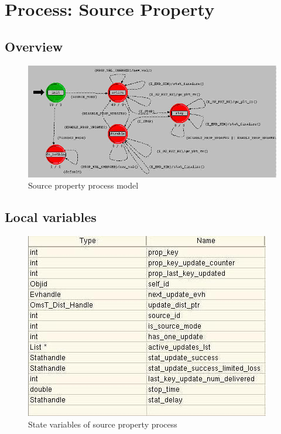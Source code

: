 
\section{Process: Source Property}

\subsection{Overview}
\begin{figure}[ht]
    \centering
    \includegraphics[scale=0.5]{images/p_source_property}
    \caption{Source property process model}
    \label{fig:appendix-a}
\end{figure}

\newpage

\subsection{Local variables}
\begin{figure}[ht]
    \centering
    \includegraphics[width=.7\textwidth]{images/state_variable_source_property}
    \caption{State variables of source property process}
    \label{fig:appendix-a_sv}
\end{figure}

